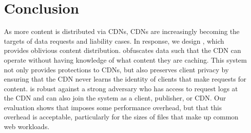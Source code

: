 \section{Conclusion}
\label{sec:conclusion}

As more content is distributed via CDNs, CDNs are increasingly becoming the
targets of data requests and liability cases. In response, we design \system{}, which provides oblivious content
distribution.  \system{} obfuscates data such that the CDN can operate without
having knowledge of what content they are caching.  This system not only
provides protections to CDNs, but also preserves client privacy by ensuring
that the CDN never learns the identity of clients that
make requests for content. \system{} is robust against a strong adversary who
has access to request logs at the CDN and can also join the system as a
client, publisher, or CDN. Our evaluation shows that \system{} imposes some performance
overhead, %
but that this overhead is acceptable, particularly for the sizes of files
that make up common web workloads.
